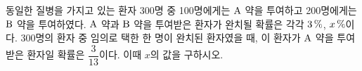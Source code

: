 동일한 질병을 가지고 있는 환자 300명 중 100명에게는 $\mathrm{A}$ 약을 투여하고 200명에게는 $\mathrm{B}$ 약을 투여하였다. $\mathrm{A}$ 약과 $\mathrm{B}$ 약을 투여받은 환자가 완치될 확률은 각각 $3\mkern3mu \%$, $x\mkern3mu \%$이다. 300명의 환자 중 임의로 택한 한 명이 완치된 환자였을 때, 이 환자가 $\mathrm{A}$ 약을 투여받은 환자일 확률은 $\dfrac{3}{13}$이다. 이때 $x$의 값을 구하시오.
